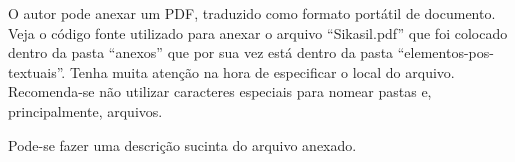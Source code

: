 \label{an:ex_anexo_b}

O autor pode anexar um \gls{PDF}, traduzido como formato portátil de documento. Veja o código fonte utilizado para anexar o arquivo ``Sikasil.pdf'' que foi colocado dentro da pasta ``anexos'' que por sua vez está dentro da pasta ``elementos-pos-textuais''. Tenha muita atenção na hora de especificar o local do arquivo. Recomenda-se não utilizar caracteres especiais para nomear pastas e, principalmente, arquivos. 

Pode-se fazer uma descrição sucinta do arquivo anexado.



